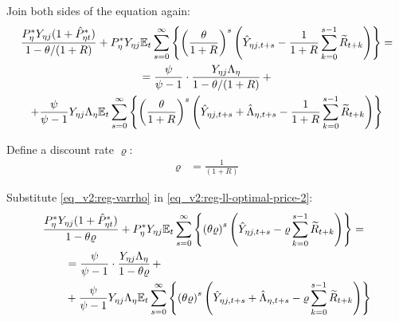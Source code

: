 \documentclass[../thesis.tex]{subfiles}
\begin{document}
Join both sides of the equation again:
\begin{multline}
	\frac{ P_{\eta}^{\ast} Y_{\eta j} ( 1 + \hat{P}_{\eta t}^{\ast} )}{1-\theta /(1+R)} + P_{\eta}^{\ast} Y_{\eta j} {\mathbb{E}_{t}} \sum_{s=0}^{\infty} \left\{ \left( \frac{\theta}{1 + R} \right)^s \left( \hat{Y}_{\eta j, t+s} - \frac{1}{1 + R} \sum_{k=0}^{s-1} \widetilde{R}_{t+k} \right) \right\} = 
	\\
	= \frac{\psi}{\psi-1} \cdot \frac{Y_{\eta j} \Lambda_{\eta}}{1-\theta /(1+R)} \, + 
	\\
	+ \frac{\psi}{\psi-1} Y_{\eta j} \Lambda_{\eta} {\mathbb{E}_{t}} \sum_{s=0}^{\infty} \left\{ \left( \frac{\theta}{1 + R} \right)^s \left( \hat{Y}_{\eta j, t+s} + \hat{\Lambda}_{\eta, t+s} - \frac{1}{1 + R} \sum_{k=0}^{s-1} \widetilde{R}_{t+k} \right) \right\} \label{eq_v2:reg-ll-optimal-price-2}
\end{multline}


Define a discount rate $\varrho$:
\begin{align}
	\varrho &= \frac{1}{(1 + R)} \label{eq_v2:reg-varrho}
\end{align}

Substitute \ref{eq_v2:reg-varrho} in \ref{eq_v2:reg-ll-optimal-price-2}:
\begin{align}
	\begin{split} & \frac{ P_{\eta}^{\ast} Y_{\eta j} ( 1 + \hat{P}_{\eta t}^{\ast} )}{1- \theta \varrho} + P_{\eta}^{\ast} Y_{\eta j} {\mathbb{E}_{t}} \sum_{s=0}^{\infty} \left\{ \left( \theta \varrho \right)^s \left( \hat{Y}_{\eta j, t+s} - \varrho \sum_{k=0}^{s-1} \widetilde{R}_{t+k} \right) \right\} = \\ & \qquad = \frac{\psi}{\psi-1} \cdot \frac{Y_{\eta j} \Lambda_{\eta}}{1- \theta \varrho} \, + \\ & \qquad + \frac{\psi}{\psi-1} Y_{\eta j} \Lambda_{\eta} {\mathbb{E}_{t}} \sum_{s=0}^{\infty} \left\{ \left( \theta \varrho \right)^s \left( \hat{Y}_{\eta j, t+s} + \hat{\Lambda}_{\eta, t+s} - \varrho \sum_{k=0}^{s-1} \widetilde{R}_{t+k} \right) \right\} \end{split} \label{eq_v2:reg-ll-optimal-price-3}
\end{align}
\end{document}
